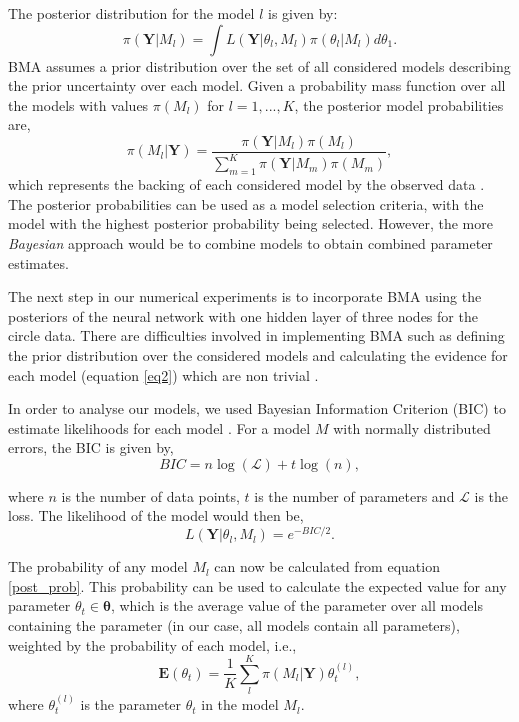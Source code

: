 \documentclass[review]{siamart190516}
\begin{document}
The posterior distribution for the model $l$ is given by:
\begin{equation}
    \pi(\mathbf{Y}|M_l) = \int L(\mathbf{Y}|\theta_l,M_l)\pi(\theta_l|M_l)d\theta_1.
    \label{eq2}
\end{equation}
BMA assumes a prior distribution over the set of all considered models describing the prior uncertainty over each model. Given a probability mass function over all the models with values $\pi(M_l)$ for $l=1,...,K$, the posterior model probabilities are,
\begin{equation}
\label{post_prob}
    \pi(M_l|\mathbf{Y}) = \frac{\pi(\mathbf{Y}|M_l)\pi(M_l)}{\sum_{m=1}^K \pi(\mathbf{Y}|M_m)\pi(M_m)},
\end{equation}
which represents the backing of each considered model by the observed data \cite{fragoso_bayesian_2018}. The posterior probabilities can be used as a model selection criteria, with the model with the highest posterior probability being selected. However, the more \textit{Bayesian} approach would be to combine models to obtain combined parameter estimates\cite{roberts1965}. 

The next step in our numerical experiments is to incorporate BMA using the posteriors of the neural network with one hidden layer of three nodes for the circle data. There are difficulties involved in implementing BMA such as defining the prior distribution over the considered models and calculating the evidence for each model (equation \ref{eq2}) which are non trivial \cite{friel_estimating_2012}. 

In order to analyse our models, we used Bayesian Information Criterion (BIC) to estimate likelihoods for each model \cite{kaggle}. For a model $M$ with normally distributed errors, the BIC is given by,
\begin{equation}
    BIC = n \log{(\mathcal{L})} + t \log{(n)},
\end{equation}

where $n$ is the number of data points, $t$ is the number of parameters and $\mathcal{L}$ is the loss. The likelihood of the model would then be,
\begin{equation}
    L(\mathbf{Y}|\theta_l,M_l) = e^{-BIC/2}.
\end{equation}

The probability of any model $M_l$ can now be calculated from equation \ref{post_prob}. This probability can be used to calculate the expected value for any parameter $\theta_t \in \mathbf{\theta}$, which is the average value of the parameter over all models containing the parameter (in our case, all models contain all parameters), weighted by the probability of each model, i.e.,
\begin{equation}
    \mathbf{E}(\theta_t) = \frac{1}{K}\sum_l^K \pi(M_l|\mathbf{Y}) \theta_t^{(l)},
\end{equation}
where $\theta_t^{(l)}$ is the parameter $\theta_t$ in the model $M_l$.
\end{document}
